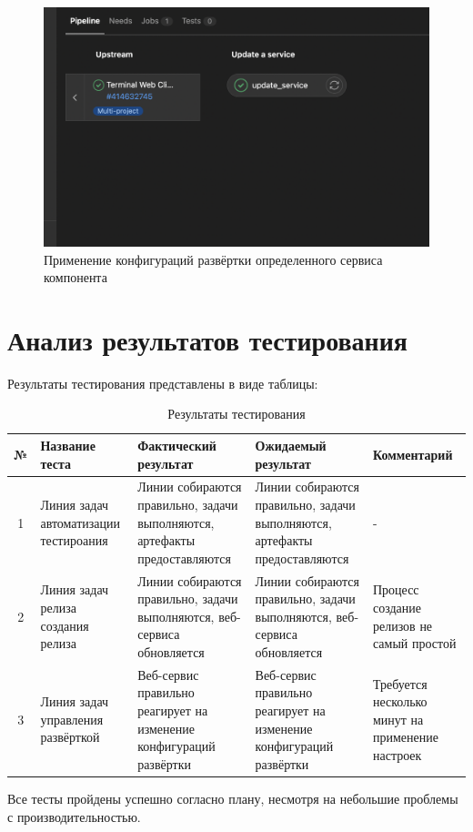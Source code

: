 \begin{enumerate}
    \begin{figure}[ht]
        \centering
        \includegraphics[scale=0.6]{figures/5}
        \caption{Применение конфигураций развёртки определенного сервиса компонента}
        \label{fig:qa-deploy-service}
    \end{figure}
\end{enumerate}

\section{Анализ результатов тестирования}

Результаты тестирования представлены в виде таблицы:

\begin{center}
    \begin{longtable}{|c|p{}|p{}|p{}|p{}|}
        \caption{Результаты тестирования}
        \label{tab:testing-res}
        \hline
        № & Название теста & Фактический результат & Ожидаемый результат & Комментарий                                                   \\
        \hline
        1 & Линия задач автоматизации тестироания  & Линии собираются правильно, задачи выполняются, артефакты предоставляются & Линии собираются правильно, задачи выполняются, артефакты предоставляются & - \\
        \hline
        2 & Линия задач релиза создания релиза  & Линии собираются правильно, задачи выполняются, веб-сервиса обновляется & Линии собираются правильно, задачи выполняются, веб-сервиса обновляется & Процесс создание релизов не самый простой  \\
        \hline
        3 & Линия задач управления развёрткой  & Веб-сервис правильно реагирует на изменение конфигураций развёртки & Веб-сервис правильно реагирует на изменение конфигураций развёртки & Требуется несколько минут на применение настроек \\
        \hline
    \end{longtable}
\end{center}

Все тесты пройдены успешно согласно плану, несмотря на небольшие проблемы с производительностью.


